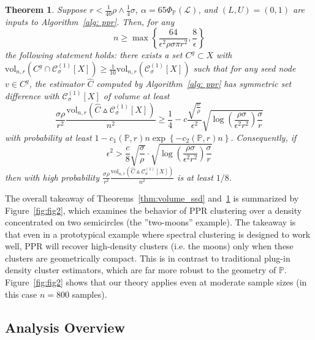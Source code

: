 \documentclass{article}
\newcommand{\set}[1]{\left\{#1\right\}}
\newcommand{\vol}{\mathrm{vol}}
\newcommand{\1}{\mathbf{1}}
\newcommand{\Cset}{\mathcal{C}}
\newcommand{\Csig}{\Cset_{\sigma}}
\newcommand{\Pbb}{\mathbb{P}}
\theoremstyle{alden}
\theoremstyle{aldenthm}
\newtheorem{theorem}{Theorem}
\theoremstyle{definition}
\theoremstyle{remark}
\begin{document}
\begin{theorem}
	\label{thm:ppr_lb}
	Suppose $r < \frac{1}{40}\rho \wedge \frac{1}{4}\sigma$,  $\alpha = 65 \Phi_{\Pbb}(\mathcal{L})$, and $(L,U) = (0,1)$ are inputs to Algorithm~\ref{alg: ppr}. Then, for any
	\begin{equation}
	\label{eqn:lb_sample_size}
	n \geq \max\set{\frac{64}{\epsilon^2 \rho \sigma \pi r^2}, \frac{8}{\epsilon}}
	\end{equation}
	the following statement holds: there exists a set $C^{g} \subset X$ with $\vol_{n,r}(C^g \cap \mathcal{C}_{\sigma}^{(1)}[X]) \geq \frac{1}{10}\vol_{n,r}(\mathcal{C}_{\sigma}^{(1)}[X])$ such that for any seed node $v \in C^g$, the estimator $\widehat{C}$ computed by Algorithm~\ref{alg: ppr} has symmetric set difference with $\Csig^{(1)}[X]$ of volume at least
	\begin{equation}
	\label{eqn:ppr_lb}
	\frac{\sigma \rho}{r^2}\frac{\vol_{n,r}(\widehat{C} \vartriangle \mathcal{C}_{\sigma}^{(1)}[X])}{n^2} \geq \frac{1}{4} -  c \frac{\sqrt{\frac{\sigma}{\rho}}}{\epsilon^2} \sqrt{ \log\left(\frac{\rho \sigma}{\epsilon^2 r^2}\right)\frac{\sigma}{r}}
	\end{equation}
	with probability at least $1 - c_1(\Pbb,r) n \exp\set{-c_2(\Pbb,r)n}$.
	Consequently, if
	\begin{equation*} 
	\epsilon^2 > \frac{c}{8} \sqrt{\frac{\sigma}{\rho}} \cdot \sqrt{ \log\left(\frac{\rho \sigma}{\epsilon^2 r^2}\right)\frac{\sigma}{r}}
	\end{equation*}
	then with high probability $\frac{\sigma \rho}{r^2}\frac{\vol_{n,r}(\widehat{C} \vartriangle \mathcal{C}_{\sigma}^{(1)}[X])}{n^2}$ is at least $1/8$. 
\end{theorem}

The overall takeaway of Theorems~\ref{thm:volume_ssd} and~\ref{thm:ppr_lb} is summarized by Figure~\ref{fig:fig2}, which examines the behavior of PPR clustering over a density concentrated on two semicircles (the ''two-moons'' example). The takeaway is that even in a prototypical example where spectral clustering is designed to work well, PPR will recover high-density clusters (i.e. the moons) only when these clusters are geometrically compact. This is in contrast to traditional plug-in density cluster estimators, which are far more robust to the geometry of $\Pbb$. Figure~\ref{fig:fig2} shows that our theory applies even at moderate sample sizes (in this case $n = 800$ samples).

\subsection{Analysis Overview}
\label{sec: analysis}
\end{document}

